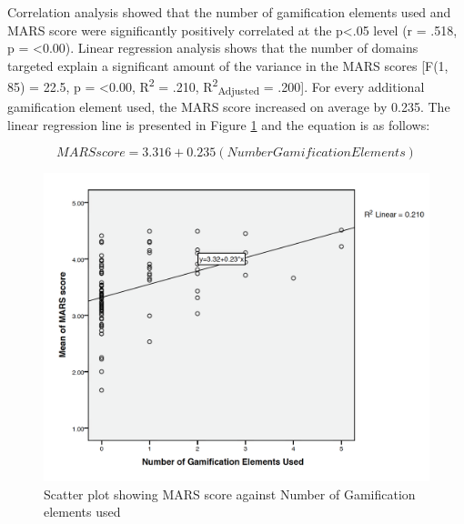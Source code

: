 
Correlation analysis showed that the number of gamification elements used and MARS score were significantly positively correlated at the p\textless.05 level (r = .518, p = \textless0.00). Linear regression analysis shows that the number of domains targeted explain a significant amount of the variance in the MARS scores [F(1, 85) = 22.5, p = \textless0.00, R\textsuperscript{2} = .210, R\textsuperscript{2}\textsubscript{Adjusted} = .200]. For every additional gamification element used, the MARS score increased on average by 0.235. The linear regression line is presented in Figure \ref{fig: gamification-regression} and the equation is as follows:

\begin{equation}
MARSscore = 3.316 + 0.235 \left(NumberGamificationElements\right)
          \label{eq: calc-performance-stars}
\end{equation}

\begin{figure}[h]
    \centering
    \includegraphics[scale=0.40, angle=0]{Files/prevention-study-1/figures/gamification-regression}
    \caption{Scatter plot showing MARS score against Number of Gamification elements used}
    \label{fig: gamification-regression}
\end{figure}

